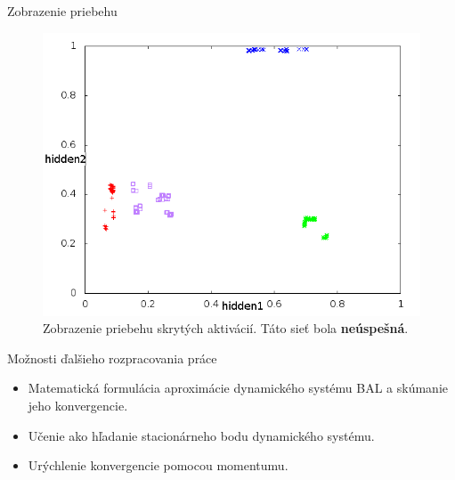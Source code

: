 \documentclass[xcolor=dvipsnames]{beamer}
\begin{document}
\begin{frame}{Zobrazenie priebehu}
  \begin{figure}[h!]  
    \centering
    \includegraphics[scale=0.4]{img/non-convergent.png}
    \caption{{\tiny Zobrazenie priebehu skrytých aktivácií. Táto sieť bola {\bf neúspešná}.}} 
  \end{figure} 
\end{frame}



\begin{frame}{Možnosti ďalšieho rozpracovania práce}
  \begin{itemize} 
    \item Matematická formulácia aproximácie dynamického systému BAL a skúmanie jeho konvergencie. 
    \item Učenie ako hľadanie stacionárneho bodu dynamického systému.
    \item Urýchlenie konvergencie pomocou momentumu. 
  \end{itemize} 
\end{frame} 
\end{document}
